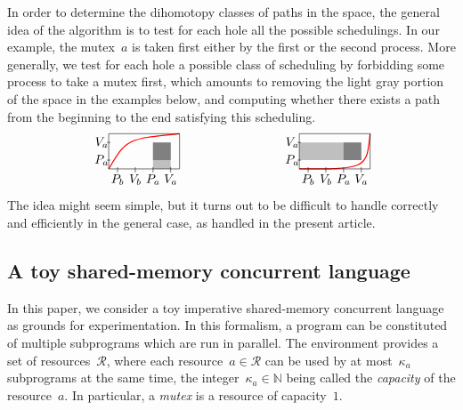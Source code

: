 \documentclass[orivec]{llncs} \usepackage[T1]{fontenc}
\newcommand{\resources}{\mathcal{R}}
\newcommand{\N}{\mathbb{N}}
\renewcommand{\P}[1]{P_{#1}}
\newcommand{\V}[1]{V_{#1}}
\newcommand{\capacity}[1]{\kappa_{#1}}
\begin{document}
{In order to determine the dihomotopy classes of paths in the space, the general
idea of the algorithm is to test for each hole all the possible schedulings. In
our example, the mutex~$a$ is taken first either by the first or the second
process. More generally, we test for each hole a possible class of scheduling by
forbidding some process to take a mutex first, which amounts to removing the light
gray portion of the space in the examples below, and computing whether there
exists a path from the beginning to the end satisfying this scheduling.
\[
\begin{tikzpicture}[scale=0.5]
  \draw[line width=0.3mm,color=red] (0,0) .. controls (1,1.7) .. (4,2);
  \fill[fill=lightgray] (2.5,0) -- (2.5,1.5) -- (3.5,1.5) -- (3.5,0) -- cycle;
  \fill[fill=gray] (2.5,.5) -- (2.5,1.5) -- (3.5,1.5) -- (3.5,.5) -- cycle;
  \foreach \x in {0,1} \draw (-1mm,\x+.5) -- (1mm,\x+.5);
  \foreach \x in {0,1,2,3} \draw (\x+.5,-2mm) -- (\x+.5,1mm);
  \draw (.5,-6mm) node {$\P b$};
  \draw (1.5,-6mm) node {$\V b$};
  \draw (2.5,-6mm) node {$\P a$};
  \draw (3.5,-6mm) node {$\V a$};
  \draw (-4mm,.5) node {$\P a$};
  \draw (-4mm,1.5) node {$\V a$};
  \draw (0,0) -- (0,2) -- (4,2) -- (4,0) -- cycle;
\end{tikzpicture}
\qquad\qquad\qquad\qquad
\begin{tikzpicture}[scale=0.5]
  \draw[line width=0.3mm,color=red] (0,0) .. controls (3.8,0) .. (4,2);
  \fill[fill=lightgray] (0,.5) -- (0,1.5) -- (3.5,1.5) -- (3.5,.5) -- cycle;
  \fill[fill=gray] (2.5,.5) -- (2.5,1.5) -- (3.5,1.5) -- (3.5,.5) -- cycle;
  \foreach \x in {0,1} \draw (-1mm,\x+.5) -- (1mm,\x+.5);
  \foreach \x in {0,1,2,3} \draw (\x+.5,-2mm) -- (\x+.5,1mm);
  \draw (.5,-6mm) node {$\P b$};
  \draw (1.5,-6mm) node {$\V b$};
  \draw (2.5,-6mm) node {$\P a$};
  \draw (3.5,-6mm) node {$\V a$};
  \draw (-4mm,.5) node {$\P a$};
  \draw (-4mm,1.5) node {$\V a$};
  \draw (0,0) -- (0,2) -- (4,2) -- (4,0) -- cycle;
\end{tikzpicture}
\]
The idea might seem simple, but it turns out to be difficult to handle correctly
and efficiently in the general case, as handled in the present
article.


}

\subsection{A toy shared-memory concurrent language}
\label{language}

In this paper, we consider a toy imperative shared-memory concurrent language as
grounds for experimentation. In this formalism, a program can be constituted of
multiple subprograms which are run in parallel. The environment provides a set
of resources~$\resources$, where each resource~$a\in\resources$ can be used by
at most~$\capacity{a}$ subprograms at the same time, the
integer~$\capacity{a}\in\N$ being called the \emph{capacity} of the
resource~$a$. In particular, a \emph{mutex} is a resource of capacity~$1$.
\end{document}
